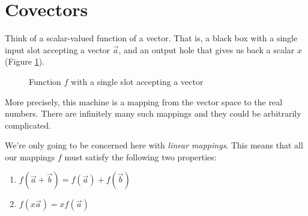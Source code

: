 \section{Covectors} \label{covector}

Think of a scalar-valued function of a vector. That is, a black box with a single input slot accepting a vector $\vec{a}$, and an output hole that gives us back a scalar $x$ (Figure \ref{fig:1-slot-box}).

\begin{figure}[h]
    \centering
    \caption{Function $f$ with a single slot accepting a vector} \label{fig:1-slot-box}
\end{figure}

More precisely, this machine is a mapping from the vector space to the real numbers. There are infinitely many such mappings and they could be arbitrarily complicated.

We're only going to be concerned here with \textit{linear mappings}. This means that all our mappings $f$ must satisfy the following two properties:

\begin{enumerate}
    \item $f(\vec{a} + \vec{b}) = f(\vec{a}) + f(\vec{b})$
    \item $f(x \vec{a}) = x f(\vec{a})$
\end{enumerate}

